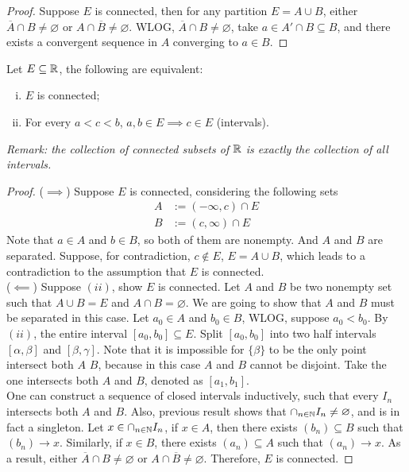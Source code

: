 \documentclass[11pt]{article}
\begin{document}
	\begin{proof}
		Suppose $E$ is connected, then for any partition $E = A \cup B$, either $\overline{A} \cap B \neq \varnothing$ or $A \cap \overline{B} \neq \varnothing$. WLOG, $\overline{A} \cap B \neq \varnothing$, take $a \in A' \cap B \subseteq B$, and there exists a convergent sequence in $A$ converging to $a \in B$.
	\end{proof}
	
	\begin{theorem}
		Let $E \subseteq \mathbb{R}$, the following are equivalent:
		\begin{enumerate}[(i)]
			\item $E$ is connected;
			\item For every $a < c < b$, $a, b \in E \implies c \in E$ (intervals).
		\end{enumerate}
		\emph{Remark: the collection of connected subsets of $\mathbb{R}$ is exactly the collection of all intervals.}
	\end{theorem}
	
	\begin{proof}
		($\implies$) Suppose $E$ is connected, considering the following sets
		\begin{align}
			A &:= (-\infty, c) \cap E \\
			B &:= (c, \infty) \cap E
		\end{align}
		Note that $a \in A$ and $b \in B$, so both of them are nonempty. And $A$ and $B$ are separated. Suppose, for contradiction, $c \notin E$, $E = A \cup B$, which leads to a contradiction to the assumption that $E$ is connected.
		\\
		($\impliedby$) Suppose $(ii)$, show $E$ is connected. Let $A$ and $B$ be two nonempty set such that $A \cup B = E$ and $A \cap B = \varnothing$. We are going to show that $A$ and $B$ must be separated in this case. Let $a_0 \in A$ and $b_0 \in B$, WLOG, suppose $a_0 < b_0$. By $(ii)$, the entire interval $[a_0, b_0] \subseteq E$. Split $[a_0, b_0]$ into two half intervals $[\alpha, \beta]$ and $[\beta, \gamma]$. Note that it is impossible for $\{\beta\}$ to be the only point intersect both $A$ $B$, because in this case $A$ and $B$ cannot be disjoint.
		Take the one intersects both $A$ and $B$, denoted as $[a_1, b_1]$. \\
		One can construct a sequence of closed intervals inductively, such that every $I_n$ intersects both $A$ and $B$. Also, previous result shows that $\cap_{n \in \mathbb{N}} I_n \neq \varnothing$, and is in fact a singleton. Let $x \in \cap_{n \in \mathbb{N}} I_n$, if $x \in A$, then there exists $(b_n) \subseteq B$ such that $(b_n) \to x$. Similarly, if $x \in B$, there exists $(a_n) \subseteq A$ such that $(a_n) \to x$. As a result, either $\overline{A} \cap B \neq \varnothing$ or $A \cap \overline{B} \neq \varnothing$. Therefore, $E$ is connected.
	\end{proof}
	
\end{document}
